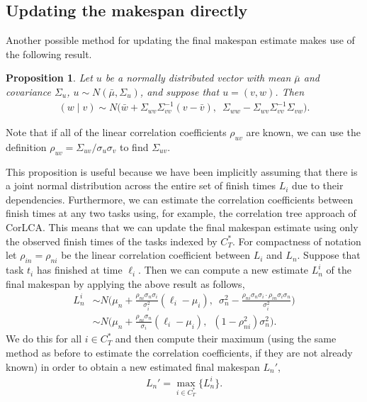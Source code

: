 \documentclass[12pt]{article}
\newtheorem{prop}[theorem]{Proposition}
\begin{document}
\subsection{Updating the makespan directly}
\label{subsect.corr_update}

Another possible method for updating the final makespan estimate makes use of the following result.
\begin{prop}
	Let $u$ be a normally distributed vector with mean $\bar{\mu}$ and covariance $\Sigma_u$, $u \sim N(\bar{\mu}, \Sigma_u)$, and suppose that $u = (v, w)$. Then 
	\begin{align*}
	(w \mid v) \sim N \big( \bar{w} + \Sigma_{wv}\Sigma_{vv}^{-1} (v - \bar{v}), \enspace  \Sigma_{ww} - \Sigma_{wv} \Sigma_{vv}^{-1} \Sigma_{vw} \big).
	\end{align*}
\end{prop}
Note that if all of the linear correlation coefficients $\rho_{uv}$ are known, we can use the definition $\rho_{uv} = \Sigma_{uv} / \sigma_u \sigma_v$ to find $\Sigma_{uv}$.

This proposition is useful because we have been implicitly assuming that there is a joint normal distribution across the entire set of finish times $L_i$ due to their dependencies. Furthermore, we can estimate the correlation coefficients between finish times at any two tasks using, for example, the correlation tree approach of CorLCA. This means that we can update the final makespan estimate using only the observed finish times of the tasks indexed by $C_T^*$. For compactness of notation let $\rho_{in} = \rho_{ni}$ be the linear correlation coefficient between $L_i$ and $L_n$. Suppose that task $t_i$ has finished at time $\ell_i$. Then we can compute a new estimate $L_n^i$ of the final makespan by applying the above result as follows,
\begin{align*}
L_n^i &\sim N \bigg( \mu_{n} + \frac{\rho_{ni} \sigma_{n} \sigma_{i}}{\sigma_{i}^2} (\ell_i - \mu_{i}), \enspace \sigma_{n}^2 - \frac{\rho_{ni} \sigma_{n} \sigma_{i} \cdot \rho_{in} \sigma_{i} \sigma_{n}}{\sigma_{i}^2} \bigg) \nonumber\\
&\sim N \bigg(\mu_{n} + \frac{\rho_{ni} \sigma_{n}}{\sigma_{i}} (\ell_i - \mu_{i}), \enspace (1 - \rho_{ni}^2) \sigma_{n}^2 \bigg).
\end{align*}
We do this for all $i \in C_T^*$ and then compute their maximum (using the same method as before to estimate the correlation coefficients, if they are not already known) in order to obtain a new estimated final makespan $L_n'$, 
\begin{align*}
  L_n' = \max_{i \in C_T^*} \{ L_n^i  \}.
  \end{align*}
\end{document}
